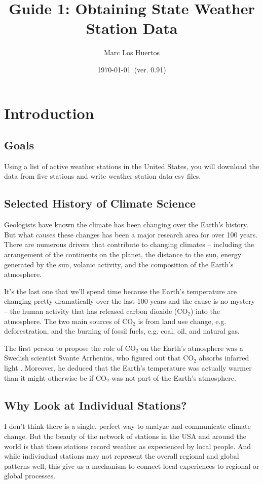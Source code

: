 \documentclass{article}\usepackage[]{graphicx}\usepackage[dvipsnames]{xcolor}
\title{Guide 1: Obtaining State Weather Station Data}
\author{Marc Los Huertos}
\date{\today~(ver. 0.91)}
\begin{document}
\maketitle

\section{Introduction}

\subsection{Goals}

Using a list of active weather stations in the United States, you  will download the data from five stations and write weather station data csv files. 

\subsection{Selected History of Climate Science}

Geologists have known the climate has been changing over the Earth's history. But what causes these changes has been a major research area for over 100 years. There are numerous drivers that contribute to changing climates -- including the arrangement of the continents on the planet, the distance to the sun, energy generated by the sun, volanic activity, and the composition of the Earth's atmosphere. 

It's the last one that we'll spend time because the Earth's temperature are changing pretty dramatically over the last 100 years and the cause is no mystery -- the human activity that has released carbon dioxide (CO$_2$) into the atmosphere. The two main sources of CO$_2$ is from land use change, e.g. deforestration, and the burning of fossil fuels, e.g. coal, oil, and natural gas. 

The first person to propose the role of CO$_2$ on the Earth's atmosphere was a Swedish scientist Svante Arrhenius, who figured out that CO$_2$ absorbs infarred light \citep{rodhe1997svante}. Moreover, he deduced that the Earth's temperature was actually warmer than it might otherwise be if CO$_2$ was not part of the Earth's atmosphere. 

\subsection{Why Look at Individual Stations?}

I don't think there is a single, perfect way to analyze and communicate climate change. But the beauty of the network of stations in the USA and around the world is that these stations record weather as expecienced by local people. And while indiviudual stations may not represent the overall regional and global patterns well, this give us a mechanism to connect local experiences to regional or global processes. 
\end{document}
